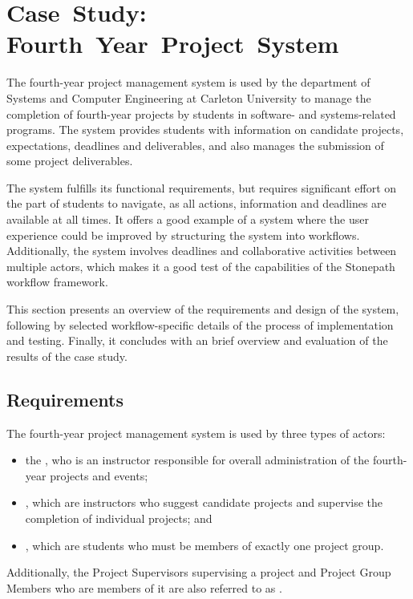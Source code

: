 \documentclass[document.tex]{subfiles}
\begin{document}
\chapter{Case~Study: Fourth~Year~Project~System}
\label {ch:case-study-1}


The fourth-year project management system is used by the department of Systems and Computer Engineering at Carleton University to manage the completion of fourth-year projects by students in software- and systems-related programs. The system provides students with information on candidate projects, expectations, deadlines and deliverables, and also manages the submission of some project deliverables.

The system fulfills its functional requirements, but requires significant effort on the part of students to navigate, as all actions, information and deadlines are available at all times. It offers a good example of a system where the user experience could be improved by structuring the system into workflows. Additionally, the system involves deadlines and collaborative activities between multiple actors, which makes it a good test of the capabilities of the Stonepath workflow framework.

This section presents an overview of the requirements and design of the system, following by selected workflow-specific details of the process of implementation and testing. Finally, it concludes with an brief overview and evaluation of the results of the case study.

\section {Requirements}
\label {sec:4ys-requirements}

The fourth-year project management system is used by three types of actors:
\begin{itemize}
\item the , who is an instructor responsible for overall administration of the fourth-year projects and events;
\item {}, which are instructors who suggest candidate projects and supervise the completion of individual projects; and
\item {}, which are students who must be members of exactly one project group.
\end{itemize}
Additionally, the Project Supervisors supervising a project and Project Group Members who are members of it are also referred to as .
\end{document}

